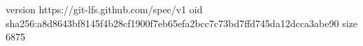 version https://git-lfs.github.com/spec/v1
oid sha256:a8d8643bf8145f4b28cf1900f7eb65efa2bcc7c73bd7ffd745da12dcca3abe90
size 6875
